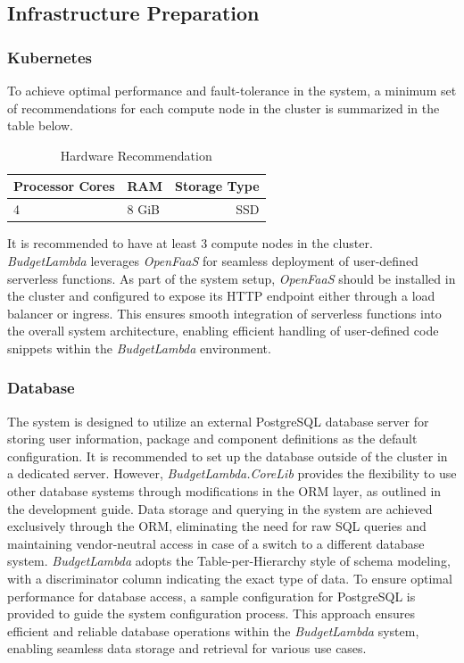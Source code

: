 \documentclass[fleqn,10pt]{SelfArx} %
\begin{document}
\subsection{Infrastructure Preparation}

\subsubsection{Kubernetes}

To achieve optimal performance and fault-tolerance in the system, a minimum set of recommendations for each compute node in the cluster is summarized in the table below.

\begin{table}[hbt]
	\caption{Hardware Recommendation}
	\centering
	\begin{tabular}{llr}
		\toprule
		Processor Cores & RAM & Storage Type \\
		\midrule
		4 & 8 GiB & SSD \\
		\bottomrule
	\end{tabular}
\end{table}

It is recommended to have at least 3 compute nodes in the cluster. \\

\emph{BudgetLambda} leverages \emph{OpenFaaS} for seamless deployment of user-defined serverless functions. As part of the system setup, \emph{OpenFaaS} should be installed in the cluster and configured to expose its HTTP endpoint either through a load balancer or ingress. This ensures smooth integration of serverless functions into the overall system architecture, enabling efficient handling of user-defined code snippets within the \emph{BudgetLambda} environment.


\subsubsection{Database}

The system is designed to utilize an external PostgreSQL database server for storing user information, package and component definitions as the default configuration. It is recommended to set up the database outside of the cluster in a dedicated server. However, \emph{BudgetLambda.CoreLib} provides the flexibility to use other database systems through modifications in the ORM layer, as outlined in the development guide. Data storage and querying in the system are achieved exclusively through the ORM, eliminating the need for raw SQL queries and maintaining vendor-neutral access in case of a switch to a different database system. \emph{BudgetLambda} adopts the Table-per-Hierarchy style of schema modeling, with a discriminator column indicating the exact type of data. To ensure optimal performance for database access, a sample configuration for PostgreSQL is provided to guide the system configuration process. This approach ensures efficient and reliable database operations within the \emph{BudgetLambda} system, enabling seamless data storage and retrieval for various use cases.
\end{document}

